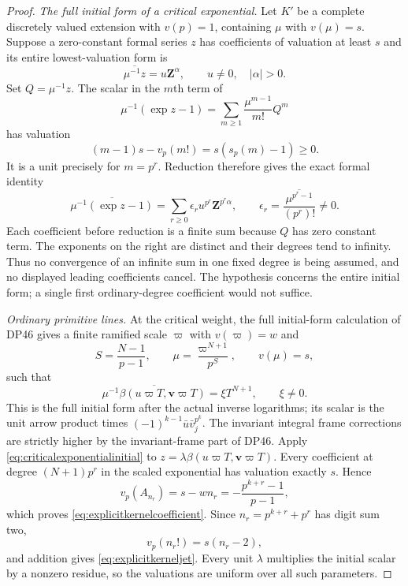 \begin{proof}
\emph{The full initial form of a critical exponential.}
Let $K'$ be a complete discretely valued extension with $v(p)=1$, containing $\mu$ with $v(\mu)=s$.
Suppose a zero-constant formal series $z$ has coefficients of valuation at least $s$ and its entire lowest-valuation form is
\[
 \overline{\mu^{-1}z}=u\mathbf Z^\alpha,
 \qquad u\ne0,\quad |\alpha|>0.
\]
Set $Q=\mu^{-1}z$.
The scalar in the $m$th term of
\[
 \mu^{-1}(\exp z-1)
 =\sum_{m\ge1}\frac{\mu^{m-1}}{m!}Q^m
\]
has valuation
\[
 (m-1)s-v_p(m!)=s(s_p(m)-1)\ge0.
\]
It is a unit precisely for $m=p^r$.
Reduction therefore gives the exact formal identity
\begin{equation}\label{eq:criticalexponentialinitial}
 \overline{\mu^{-1}(\exp z-1)}
 =\sum_{r\ge0}\epsilon_r u^{p^r}\mathbf Z^{p^r\alpha},
 \qquad
 \epsilon_r=\overline{\frac{\mu^{p^r-1}}{(p^r)!}}\ne0.
\end{equation}
Each coefficient before reduction is a finite sum because $Q$ has zero constant term.
The exponents on the right are distinct and their degrees tend to infinity.
Thus no convergence of an infinite sum in one fixed degree is being assumed, and no displayed leading coefficients cancel.
The hypothesis concerns the entire initial form; a single first ordinary-degree coefficient would not suffice.

\emph{Ordinary primitive lines.}
At the critical weight, the full initial-form calculation of DP46 gives a finite ramified scale $\varpi$ with $v(\varpi)=w$ and
\[
 S=\frac{N-1}{p-1},\qquad
 \mu=\frac{\varpi^{N+1}}{p^S},\qquad v(\mu)=s,
\]
such that
\[
 \overline{\mu^{-1}\beta(u\varpi T,\mathbf v\varpi T)}
 =\xi T^{N+1},\qquad \xi\ne0.
\]
This is the full initial form after the actual inverse logarithms; its scalar is the unit arrow product times
$(-1)^{k-1}\bar u\bar v_j^{p^k}$.
The invariant integral frame corrections are strictly higher by the invariant-frame part of DP46.
Apply \eqref{eq:criticalexponentialinitial} to $z=\lambda\beta(u\varpi T,\mathbf v\varpi T)$.
Every coefficient at degree $(N+1)p^r$ in the scaled exponential has valuation exactly $s$.
Hence
\[
 v_p(A_{n_r})=s-wn_r
 =-\frac{p^{k+r}-1}{p-1},
\]
which proves \eqref{eq:explicitkernelcoefficient}.
Since $n_r=p^{k+r}+p^r$ has digit sum two,
\[
 v_p(n_r!)=s(n_r-2),
\]
and addition gives \eqref{eq:explicitkerneljet}.
Every unit $\lambda$ multiplies the initial scalar by a nonzero residue, so the valuations are uniform over all such parameters.


\end{proof}
